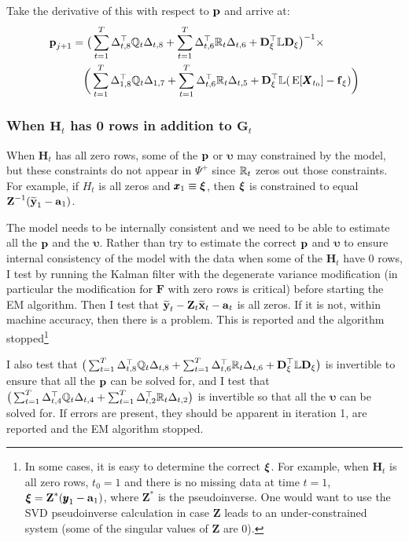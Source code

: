 \documentclass[]{article}
\def\uupsilon{\pmb{\upsilon}}
\def\xixi{\mbox{\boldmath $\xi$}}
\def\LAMm{\mathbb{L}}
\def\ZZ{\mbox{$\mathbf Z$}}	\def\zz{\mbox{$\mathbf z$}}
\def\DD{\mbox{$\mathbf D$}}	\def\dd{\mbox{$\mathbf d$}}
\def\FF{\mbox{$\mathbf F$}} \def\ff{\mbox{$\mathbf f$}}
\def\GG{\mbox{$\mathbf G$}}	\def\gg{\mbox{$\mathbf g$}}
\def\HH{\mbox{$\mathbf H$}}	\def\hh{\mbox{$\mathbf h$}}
\def\XX{\mbox{$\pmb{X}$}}	\def\xx{\mbox{$\pmb{x}$}}
\def\E{\,\textup{\textrm{E}}}
\def\hatxt{\widetilde{\mbox{$\mathbf x$}}_t}
\def\hatyt{\widetilde{\mbox{$\mathbf y$}}_t}
\def\hatyone{\widetilde{\mbox{$\mathbf y$}}_1}
\begin{document}
Take the derivative of this with respect to $\mbox{$\mathbf p$}$ and arrive at:
\begin{equation}
\begin{split}
\label{eq:p.degen.update.x0.0.a.fixed}
\pp_{j+1} &= \big(\sum_{t=1}^T\Delta_{t,8}^\top\Qm_t\Delta_{t,8} + \sum_{t=1}^T\Delta_{t,6}^\top\Rm_t\Delta_{t,6} + \DD_\xi^\top\LAMm\DD_\xi\big)^{-1} \times\\
&\quad \bigg(\sum_{t=1}^T\Delta_{1,8}^\top\Qm_t\Delta_{1,7} + \sum_{t=1}^T \Delta_{t,6}^\top\Rm_t\Delta_{t,5} + \DD_\xi^\top\LAMm(\E[\XX_{t_0}] - \ff_\xi)\bigg)
\end{split}
\end{equation}

\subsubsection{When $\HH_t$ has 0 rows in addition to $\GG_t$}
When $\HH_t$ has all zero rows, some of the $\mbox{$\mathbf p$}$ or $\uupsilon$ may constrained by the model, but these constraints do not appear in $\Psi^+$ since $\mathbb{R}_t$ zeros out those constraints.  For example, if $H_t$ is all zeros and $\xx_1 \equiv \xixi$, then $\xixi$ is constrained to equal $\ZZ^{-1}(\hatyone-\aa_1)$.    

The model needs to be internally consistent and we need to be able to estimate all the $\mbox{$\mathbf p$}$ and the $\uupsilon$.  Rather than try to estimate the correct $\mbox{$\mathbf p$}$ and $\uupsilon$ to ensure internal consistency of the model with the data when some of the $\HH_t$ have 0 rows, I test by running the Kalman filter with the degenerate variance modification (in particular the modification for $\FF$ with zero rows is critical) before starting the EM algorithm.  Then I test that $\hatyt-\ZZ_t\hatxt-\aa_t$ is all zeros.  If it is not, within machine accuracy, then there is a problem.  This is reported and the algorithm stopped\footnote{In some cases, it is easy to determine the correct $\xixi$.  For example, when $\HH_t$ is all zero rows, $t_0=1$ and there is no missing data at time $t=1$, $\xixi=\ZZ^*(\yy_1-\aa_1)$, where $\ZZ^*$ is the pseudoinverse. One would want to use the SVD pseudoinverse calculation in case $\ZZ$ leads to an under-constrained system (some of the singular values of $\ZZ$ are 0). }  

I also test that $\big(\sum_{t=1}^T\Delta_{t,8}^\top\Qm_t\Delta_{t,8} + \sum_{t=1}^T\Delta_{t,6}^\top\Rm_t\Delta_{t,6} + \DD_\xi^\top\LAMm\DD_\xi\big)$ is invertible to ensure that all the $\mbox{$\mathbf p$}$ can be solved for, and I test that $\big(\sum_{t=1}^T\Delta_{t,4}^\top\mathbb{Q}_t\Delta_{t,4} + \sum_{t=1}^T\Delta_{t,2}^\top\mathbb{R}_t\Delta_{t,2}\big)$ is invertible so that all the $\uupsilon$ can be solved for.  If errors are present, they should be apparent in iteration 1, are reported and the EM algorithm stopped.
\end{document}
